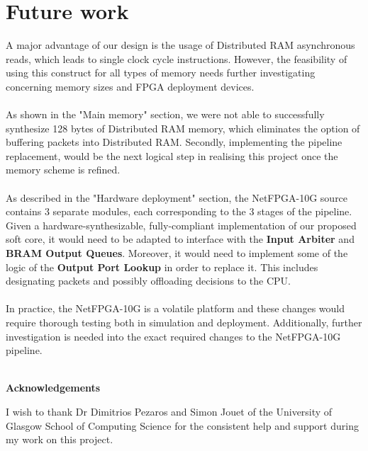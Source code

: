 \documentclass{l4proj}
\begin{document}
\section{Future work}
A major advantage of our design is the usage of Distributed RAM asynchronous reads, which leads to single clock cycle instructions. However, the feasibility of using this construct for all types of memory needs further investigating concerning memory sizes and FPGA deployment devices.\\\\
As shown in the "Main memory" section, we were not able to successfully synthesize 128 bytes of Distributed RAM memory, which eliminates the option of buffering packets into Distributed RAM.
Secondly, implementing the pipeline replacement, would be the next logical step in realising this project once the memory scheme is refined.\\\\
As described in the "Hardware deployment" section, the NetFPGA-10G source contains 3 separate modules, each corresponding to the 3 stages of the pipeline. Given a hardware-synthesizable, fully-compliant implementation of our proposed soft core, it would need to be adapted to interface with the \textbf{Input Arbiter} and \textbf{BRAM Output Queues}. Moreover, it would need to implement some of the logic of the \textbf{Output Port Lookup} in order to replace it. This includes designating packets and possibly offloading decisions to the CPU.\\\\
In practice, the NetFPGA-10G is a volatile platform and these changes would require thorough testing both in simulation and deployment. Additionally, further investigation is needed into the exact required changes to the NetFPGA-10G pipeline.\\\\

\begin{center}
\LARGE{\textbf{Acknowledgements}}
\end{center}
I wish to thank Dr Dimitrios Pezaros and Simon Jouet of the University of Glasgow School of Computing Science for the consistent help and support during my work on this project.
\end{document}
